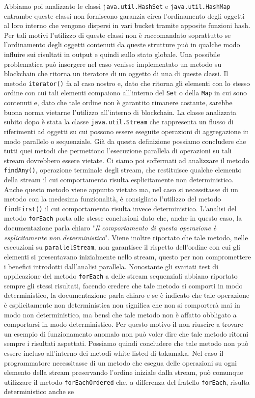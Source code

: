 Abbiamo poi analizzato le classi \lstinline|java.util.HashSet| e \lstinline|java.util.HashMap| entrambe queste classi non forniscono garanzia circa l'ordinamento degli oggetti al loro interno che vengono dispersi in vari bucket tramite apposite funzioni hash. Per tali motivi l'utilizzo di queste classi non è raccomandato soprattutto se l'ordinamento degli oggetti contenuti da queste strutture può in qualche modo influire sui risultati in output e quindi sullo stato globale. Una possibile problematica può insorgere nel caso venisse implementato un metodo su blockchain che ritorna un iteratore di un oggetto di una di queste classi. Il metodo \lstinline|iterator()| fa al caso nostro e, dato che ritorna gli elementi con lo stesso ordine con cui tali elementi compaiono all'interno del \lstinline|Set| o della \lstinline|Map| in cui sono contenuti e, dato che tale ordine non è garantito rimanere costante, sarebbe buona norma vietarne l'utilizzo all'interno di blockchain. La classe analizzata subito dopo è stata la classe \lstinline|java.util.Stream| che rappresenta un flusso di riferimenti ad oggetti su cui possono essere eseguite operazioni di aggregazione in modo parallelo o sequenziale. Già da questa definizione possiamo concludere che tutti quei metodi che permettono l'esecuzione parallela di operazioni su tali stream dovrebbero essere vietate. Ci siamo poi soffermati ad analizzare il metodo \lstinline|findAny()|, operazione terminale degli stream, che restituisce qualche elemento della stream il cui comportamento risulta esplicitamente non deterministico. Anche questo metodo viene appunto vietato ma, nel caso si necessitasse di un metodo con la medesima funzionalità, è consigliato l'utilizzo del metodo \lstinline|findFirst()| il cui comportamento risulta invece deterministico. L'analisi del metodo \lstinline|forEach| porta alle stesse conclusioni dato che, anche in questo caso, la documentazione parla chiaro "\textit{Il comportamento di questa operazione è esplicitamente non deterministico}". Viene inoltre riportato che tale metodo, nelle esecuzioni su \lstinline|parallelStream|, non garantisce il rispetto dell'ordine con cui gli elementi si presentavano inizialmente nello stream, questo per non compromettere i benefici introdotti dall'analisi parallela. Nonostante gli svariati test di applicazione del metodo \lstinline|forEach| a delle stream sequenziali abbiano riportato sempre gli stessi risultati, facendo credere che tale metodo si comporti in modo deterministico, la documentazione parla chiaro e se è indicato che tale operazione è esplicitamente non deterministica non significa che non si comporterà mai in modo non deterministico, ma bensì che tale metodo non è affatto obbligato a comportarsi in modo deterministico. Per questo motivo il non riuscire a trovare un esempio di funzionamento anomalo non può voler dire che tale metodo ritorni sempre i risultati aspettati. Possiamo quindi concludere che tale metodo non può essere incluso all'interno dei metodi white-listed di takamaka. Nel caso il programmatore necessitasse di un metodo che esegua delle operazioni su ogni elemento della stream preservando l'ordine iniziale dalla stream, può comunque utilizzare il metodo \lstinline|forEachOrdered| che, a differenza del fratello \lstinline|forEach|, risulta deterministico anche se 